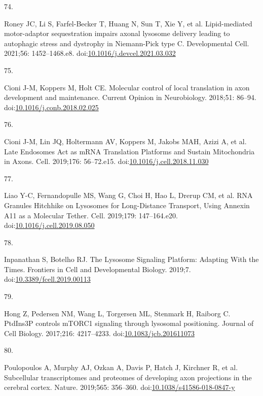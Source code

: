 \documentclass[
  12pt,
  a4paper,
]{book}
\newlength{\cslhangindent}
\newlength{\csllabelwidth}
\newlength{\cslentryspacingunit} %
\newenvironment{CSLReferences}[2] %
 {%
  \setlength{\parindent}{0pt}
  \ifodd #1
  \let\oldpar\par
  \def\par{\hangindent=\cslhangindent\oldpar}
  \fi
  \setlength{\parskip}{#2\cslentryspacingunit}
 }%
 {}
\newcommand{\CSLLeftMargin}[1]{\parbox[t]{\csllabelwidth}{#1}}
\newcommand{\CSLRightInline}[1]{\parbox[t]{\linewidth - \csllabelwidth}{#1}\break}
\begin{document}
\begin{CSLReferences}{0}{0}
\leavevmode{}%
\CSLLeftMargin{74. }%
\CSLRightInline{Roney JC, Li S, Farfel-Becker T, Huang N, Sun T, Xie Y, et al. Lipid-mediated motor-adaptor sequestration impairs axonal lysosome delivery leading to autophagic stress and dystrophy in {Niemann-Pick} type {C}. Developmental Cell. 2021;56: 1452--1468.e8. doi:\href{https://doi.org/10.1016/j.devcel.2021.03.032}{10.1016/j.devcel.2021.03.032}}

\leavevmode{}%
\CSLLeftMargin{75. }%
\CSLRightInline{Cioni J-M, Koppers M, Holt CE. Molecular control of local translation in axon development and maintenance. Current Opinion in Neurobiology. 2018;51: 86--94. doi:\href{https://doi.org/10.1016/j.conb.2018.02.025}{10.1016/j.conb.2018.02.025}}

\leavevmode{}%
\CSLLeftMargin{76. }%
\CSLRightInline{Cioni J-M, Lin JQ, Holtermann AV, Koppers M, Jakobs MAH, Azizi A, et al. Late {Endosomes Act} as {mRNA Translation Platforms} and {Sustain Mitochondria} in {Axons}. Cell. 2019;176: 56--72.e15. doi:\href{https://doi.org/10.1016/j.cell.2018.11.030}{10.1016/j.cell.2018.11.030}}

\leavevmode{}%
\CSLLeftMargin{77. }%
\CSLRightInline{Liao Y-C, Fernandopulle MS, Wang G, Choi H, Hao L, Drerup CM, et al. {RNA Granules Hitchhike} on {Lysosomes} for {Long-Distance Transport}, {Using Annexin A11} as a {Molecular Tether}. Cell. 2019;179: 147--164.e20. doi:\href{https://doi.org/10.1016/j.cell.2019.08.050}{10.1016/j.cell.2019.08.050}}

\leavevmode{}%
\CSLLeftMargin{78. }%
\CSLRightInline{Inpanathan S, Botelho RJ. The {Lysosome Signaling Platform}: {Adapting With} the {Times}. Frontiers in Cell and Developmental Biology. 2019;7. doi:\href{https://doi.org/10.3389/fcell.2019.00113}{10.3389/fcell.2019.00113}}

\leavevmode{}%
\CSLLeftMargin{79. }%
\CSLRightInline{Hong Z, Pedersen NM, Wang L, Torgersen ML, Stenmark H, Raiborg C. {PtdIns3P} controls {mTORC1} signaling through lysosomal positioning. Journal of Cell Biology. 2017;216: 4217--4233. doi:\href{https://doi.org/10.1083/jcb.201611073}{10.1083/jcb.201611073}}

\leavevmode{}%
\CSLLeftMargin{80. }%
\CSLRightInline{Poulopoulos A, Murphy AJ, Ozkan A, Davis P, Hatch J, Kirchner R, et al. Subcellular transcriptomes and proteomes of developing axon projections in the cerebral cortex. Nature. 2019;565: 356--360. doi:\href{https://doi.org/10.1038/s41586-018-0847-y}{10.1038/s41586-018-0847-y}}


\end{CSLReferences}
\end{document}
